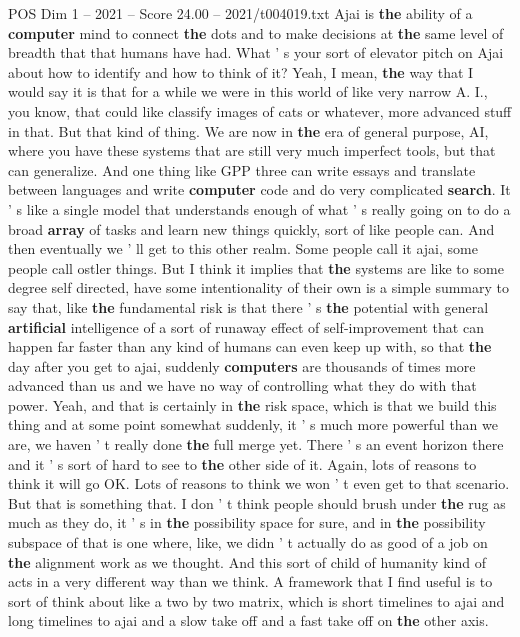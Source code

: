 \begin{textsample}{POS Dim 1 – 2021 – Score 24.00 – 2021/t004019.txt}
Ajai is \textbf{the} ability of a \textbf{computer} mind to connect \textbf{the} dots and to make decisions at \textbf{the} same level of breadth that that humans have had.
What ' s your sort of elevator pitch on Ajai about how to identify and how to think of it?
Yeah, I mean, \textbf{the} way that I would say it is that for a while we were in this world of like very narrow A.
I., you know, that could like classify images of cats or whatever, more advanced stuff in that.
But that kind of thing.
We are now in \textbf{the} era of general purpose, AI, where you have these systems that are still very much imperfect tools, but that can generalize.
And one thing like GPP three can write essays and translate between languages and write \textbf{computer} code and do very complicated \textbf{search}.
It ' s like a single model that understands enough of what ' s really going on to do a broad \textbf{array} of tasks and learn new things quickly, sort of like people can.
And then eventually we ' ll get to this other realm.
Some people call it ajai, some people call ostler things.
But I think it implies that \textbf{the} systems are like to some degree self directed, have some intentionality of their own is a simple summary to say that, like \textbf{the} fundamental risk is that there ' s \textbf{the} potential with general \textbf{artificial} intelligence of a sort of runaway effect of self-improvement that can happen far faster than any kind of humans can even keep up with, so that \textbf{the} day after you get to ajai, suddenly \textbf{computers} are thousands of times more advanced than us and we have no way of controlling what they do with that power.
Yeah, and that is certainly in \textbf{the} risk space, which is that we build this thing and at some point somewhat suddenly, it ' s much more powerful than we are, we haven ' t really done \textbf{the} full merge yet.
There ' s an event horizon there and it ' s sort of hard to see to \textbf{the} other side of it.
Again, lots of reasons to think it will go OK.
Lots of reasons to think we won ' t even get to that scenario.
But that is something that.
I don ' t think people should brush under \textbf{the} rug as much as they do, it ' s in \textbf{the} possibility space for sure, and in \textbf{the} possibility subspace of that is one where, like, we didn ' t actually do as good of a job on \textbf{the} alignment work as we thought.
And this sort of child of humanity kind of acts in a very different way than we think.
A framework that I find useful is to sort of think about like a two by two matrix, which is short timelines to ajai and long timelines to ajai and a slow take off and a fast take off on \textbf{the} other axis.

\end{textsample}
